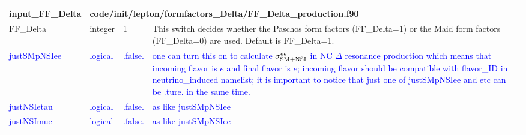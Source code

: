 \documentclass{article}
\begin{document}

\begin{longtable}{llll}
\toprule
\textbf{\large{input\_FF\_Delta}} & \multicolumn{3}{l}{\footnotesize{code/init/lepton/formfactors\_Delta/FF\_Delta\_production.f90}}\\*
\midrule
\endfirsthead
\midrule
\endhead
FF\_Delta & \begin{minipage}[t]{2cm}integer\end{minipage} & \begin{minipage}[t]{2cm}1\end{minipage} & \begin{minipage}[t]{12cm}This switch decides whether the Paschos form factors (FF\_Delta=1) or the Maid form factors (FF\_Delta=0) are used. Default is FF\_Delta=1.\end{minipage}\\*
\midrule
\textcolor{blue}{justSMpNSIee} & \begin{minipage}[t]{2cm}\textcolor{blue}{logical}\end{minipage} & \begin{minipage}[t]{2cm}\textcolor{blue}{.false.}\end{minipage} & \begin{minipage}[t]{12cm}\textcolor{blue}{one can turn this on to calculate $\sigma_{\rm SM+NSI}^{e e}$ in NC $\Delta$ resonance production which means that incoming flavor is $e$ and final flavor is $e$; incoming flavor should be compatible with flavor\_ID in neutrino\_induced namelist; it is important to notice that just one of justSMpNSIee and etc can be .ture. in the same time.}\end{minipage}\\*
\midrule
\textcolor{blue}{justNSIetau} & \begin{minipage}[t]{2cm}\textcolor{blue}{logical}\end{minipage} & \begin{minipage}[t]{2cm}\textcolor{blue}{.false.}\end{minipage} & \begin{minipage}[t]{12cm}\textcolor{blue}{as like justSMpNSIee}\end{minipage}\\*
\midrule
\textcolor{blue}{justNSImue} & \begin{minipage}[t]{2cm}\textcolor{blue}{logical}\end{minipage} & \begin{minipage}[t]{2cm}\textcolor{blue}{.false.}\end{minipage} & \begin{minipage}[t]{12cm}\textcolor{blue}{as like justSMpNSIee}\end{minipage}\\*

\end{longtable}
\end{document}
